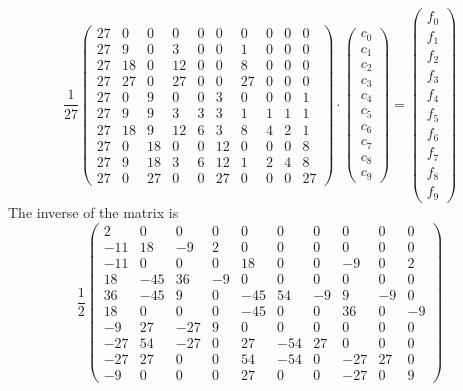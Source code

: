 \[
\frac{1}{27}
\left(
\begin{array}{cccccccccc}
27 & 0& 0&0&0&0&0&0&0&0 \\
27 & 9 & 0 & 3 &0 &0 & 1 & 0 & 0 & 0 \\
27 & 18 & 0 & 12 & 0 & 0 & 8 &0 &0 &0   \\
27 & 27 & 0 & 27 &0 & 0 &27 &0 &0 &0    \\
27 & 0 & 9 & 0 & 0 & 3 & 0& 0& 0 & 1\\
27 & 9 & 9 & 3 & 3 & 3 & 1 & 1 & 1 & 1    \\
27 & 18 & 9 & 12 & 6 & 3 & 8  & 4  & 2  & 1    \\
27 & 0 & 18 & 0 & 0 & 12 & 0& 0& 0& 8  \\
27 & 9 & 18 & 3 & 6 & 12 & 1 & 2 & 4 & 8\\
27 & 0 & 27 & 0 & 0 &27 & 0 & 0 & 0 & 27  
\end{array}
\right)
\cdot
\left(
\begin{array}{c}
c_0 \\ c_1 \\ c_2 \\ c_3 \\ c_4 \\ c_5 \\ c_6 \\ c_7 \\ c_8 \\ c_9
\end{array}
\right)
=
\left(
\begin{array}{c}
f_0 \\ f_1 \\ f_2 \\ f_3 \\ f_4 \\ f_5 \\ f_6 \\ f_7 \\ f_8 \\ f_9
\end{array}
\right)
\]
The inverse of the matrix is 
\[
\frac12
\left(
\begin{array}{cccccccccc}
2 &0 &0 &0 &0 &0 &0 &0 &0 &0\\
-11 & 18 & -9 & 2 &0 &0 &0 &0 &0 & 0 \\
-11 & 0 & 0 & 0 & 18 & 0 & 0 & -9 & 0 & 2 \\
18 & -45 & 36 &-9 &  0& 0& 0& 0& 0& 0 \\
36 &-45 & 9 & 0 &  -45 & 54 &-9 & 9 &  -9 & 0\\
18 &0& 0& 0 & -45& 0 &0 & 36& 0 &-9 \\
-9 & 27 &-27 & 9 &  0 & 0 & 0 & 0  &  0 & 0\\
-27 & 54& -27& 0& 27 &-54 & 27 &0 &0 &0 \\
-27 & 27 &0 &0 &54& -54 &0 &-27  &  27 &0 \\
-9 &0 &0 &0 &27 &0& 0 &-27 &0&  9
\end{array}
\right)
\]
